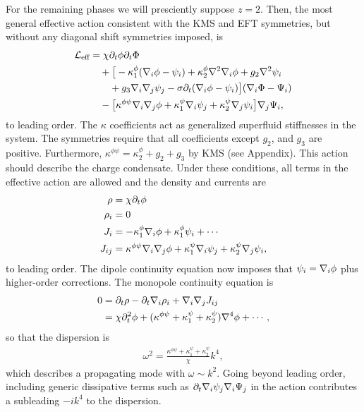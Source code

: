 For the remaining phases we will presciently suppose $z=2$. Then, the most general effective action consistent with the KMS and EFT symmetries, but without any diagonal shift symmetries imposed, is
\begin{align}
\mathcal{L}_{\text{eff}} &= \chi \partial_t \phi \partial_t \Phi \nonumber\\
&\quad + \big[ -\kappa^\phi_1 (\nabla_i \phi - \psi_i) + \kappa^\phi_2\nabla^2\nabla_i\phi +g_2 \nabla^2\psi_i \nonumber\\
&\qquad +g_3 \nabla_i\nabla_j \psi_j - \sigma \partial_t(\nabla_i \phi - \psi_i)\big] (\nabla_i \Phi - \Psi_i)  \nonumber\\
&\quad - \big[ \kappa^{\phi\psi}\nabla_i\nabla_j \phi + \kappa^\psi_1 \nabla_i \psi_j + \kappa^\psi_2 \nabla_j \psi_i  \big] \nabla_j \Psi_i,
\end{align}
to leading order. The $\kappa$ coefficients act as generalized superfluid stiffnesses in the system. The symmetries require that all coefficients except $g_2$, and $g_3$ are positive. Furthermore, $\kappa^{\phi\psi}=\kappa^\phi_2+g_2+g_3$ by KMS (see Appendix). This action should describe the charge condensate. Under these conditions, all terms in the effective action are allowed and the density and currents are
\begin{align}
\rho &= \chi\partial_t \phi \nonumber\\
\rho_i &= 0 \nonumber\\
J_i &= -\kappa^\phi_1\nabla_i \phi + \kappa^\phi_1 \psi_i + \cdots \nonumber\\
J_{ij} &= \kappa^{\phi\psi} \nabla_i\nabla_j \phi + \kappa^\psi_1 \nabla_i \psi_j + \kappa^\psi_2 \nabla_j \psi_i,
\end{align}
to leading order. The dipole continuity equation now imposes that $\psi_i = \nabla_i \phi$ plus higher-order corrections. The monopole continuity equation is 
\begin{align}
0 &= \partial_t \rho - \partial_t\nabla_i\rho_i + \nabla_i\nabla_j J_{ij} \nonumber\\
&= \chi\partial_t^2 \phi + (\kappa^{\phi\psi} + \kappa^\psi_1 + \kappa^\psi_2)\nabla^4 \phi + \cdots,
\end{align}
so that the dispersion is
\begin{align}
\omega^2 = \frac{\kappa^{\phi\psi} + \kappa^\psi_1 + \kappa^\psi_2}{\chi}k^4,
\end{align}
which describes a propagating mode with $\omega\sim k^2$. Going beyond leading order, including generic dissipative terms such as $ \partial_t \nabla_i \psi_j \nabla_i \Psi_j$ in the action contributes a subleading $-i k^4$ to the dispersion. 

